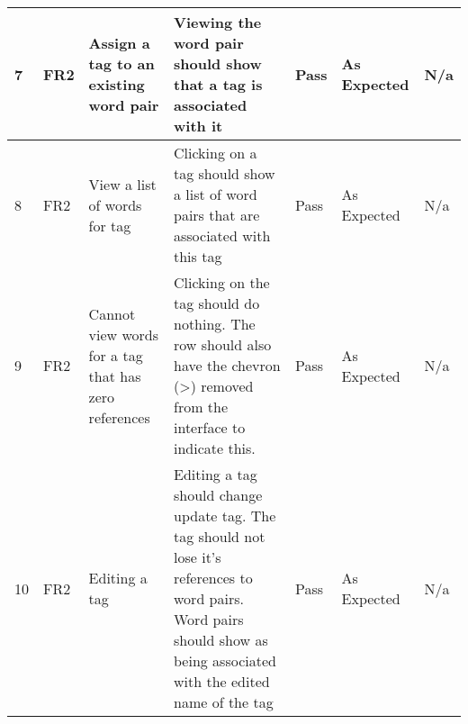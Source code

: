 \documentclass[paper=a4, fontsize=11pt]{scrartcl}	%
\numberwithin{equation}{section}															%
\numberwithin{figure}{section}																%
\numberwithin{table}{section}
\begin{document}
\begin{landscape}
\begin{longtable}{|l|p{2cm}|p{5cm}|p{5cm}|l|p{5cm}|p{5cm}|}
7  & FR2                    & Assign a tag to an existing word pair                & Viewing the word pair should show that a tag is associated with it                                                                                                                                                                         & Pass      & As Expected                                        & N/a                                                                                                                                                                                                                        \\ \hline
8  & FR2                    & View a list of words for tag                         & Clicking on a tag should show a list of word pairs that are associated with this tag                                                                                                                                                       & Pass      & As Expected                                        & N/a                                                                                                                                                                                                                        \\ \hline
9  & FR2                    & Cannot view words for a tag that has zero references & Clicking on the tag should do nothing. The row should also have the chevron (\textgreater) removed from the interface to indicate this.                                                                                                    & Pass      & As Expected                                        & N/a                                                                                                                                                                                                                        \\ \hline
10 & FR2                    & Editing a tag                                        & Editing a tag should change update tag. The tag should not lose it’s references to word pairs. Word pairs should show as being associated with the edited name of the tag                                                                  & Pass      & As Expected                                        & N/a                                                                                                                                                                                                                        \\ \hline

\end{longtable}
\end{landscape}
\end{document}
